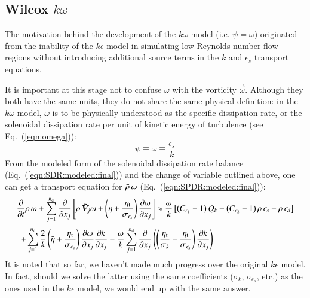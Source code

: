 \documentclass{warpdoc}
\newcommand{\alb}{\vspace{0.2cm}\\} %
\newcommand{\nd}{{{n}_{\rm d}}}
\newcommand{\turb}{_{\rm t}}
\newcommand{\etat}{{\eta\turb}}
\newcommand{\mfd}{\displaystyle}
\begin{document}
\subsection{Wilcox $k\omega$}

The motivation behind the development of the $k\omega$
model\cite{turb:wilcox1988} (i.e. $\psi=\omega$) originated from the inability of
the $k\epsilon$ model in simulating low Reynolds number flow regions
without introducing additional source terms in the $k$ and $\epsilon_s$
transport equations.

It is important at this stage not to confuse $\omega$ with the
vorticity $\vec{\omega}$. Although they both have the same units,
they do not share the same physical definition: in the
$k\omega$ model, $\omega$ is to be physically understood as
the specific dissipation rate, or the solenoidal dissipation rate per
unit of kinetic energy of turbulence (see Eq.\ (\ref{eqn:omega})):
%
\begin{displaymath}
  \psi \equiv \omega \equiv \frac{\epsilon_s}{k}
\end{displaymath}
%
From the modeled form of the solenoidal dissipation rate balance
(Eq.\ (\ref{eqn:SDR:modeled:final})) and the change of variable
outlined above, one can get a transport equation for $\bar{\rho}\, \omega$
(Eq.\ (\ref{eqn:SPDR:modeled:final})):
%
\begin{equation}
  \begin{array}{l}
    \mfd\frac{\partial }{\partial t}\wbar{\rho}\,\omega+\sum_{j=1}^\nd \frac{\partial}{\partial x_j}
            \left[
                \wbar{\rho}\, {\wtilde{\bm{V}}_j} \omega
               +\left( \wbar{\eta} +\frac{\etat}{\sigma_{\epsilon_s}} \right)\frac{\partial \omega}{\partial x_j}
            \right]
       \approx  \frac{\omega}{k}
         \left[
            \left(C_{\epsilon_1}-1\right) Q_k
           -\left(C_{\epsilon_2}-1\right) \wbar{\rho}\, \epsilon_s
           +\wbar{\rho}\, \epsilon_d
         \right]
  \alb~~
  +\mfd\sum_{j=1}^\nd \frac{2}{k}\left( \wbar{\eta} +\frac{\etat}{\sigma_{\epsilon_s}} \right)\frac{\partial \omega}{\partial x_j}    \frac{\partial k}{\partial x_j}
  -\mfd\frac{\omega}{k}
     \sum_{j=1}^{\nd} \frac{\partial }{\partial x_j}
     \left( \left( \frac{\etat}{\sigma_k}-\frac{\etat}{\sigma_{\epsilon_s}} \right) \frac{\partial k}{\partial x_j} \right)
  \end{array}
  \label{eqn:SPDR:modeled:4}
\end{equation}
%
It is noted that so far, we haven't made much progress over the original
$k\epsilon$ model. In fact, should we solve the latter using the same coefficients
($\sigma_k$, $\sigma_{\epsilon_s}$, etc.) as the ones used in the $k\epsilon$
model, we would end up with the same answer.
\end{document}
